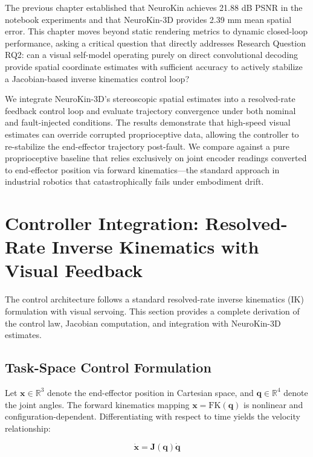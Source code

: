 \documentclass[12pt,a4paper,oneside]{report}
\begin{document}
The previous chapter established that NeuroKin achieves 21.88 dB PSNR in the notebook experiments and that NeuroKin-3D provides 2.39 mm mean spatial error. This chapter moves beyond static rendering metrics to dynamic closed-loop performance, asking a critical question that directly addresses Research Question RQ2: can a visual self-model operating purely on direct convolutional decoding provide spatial coordinate estimates with sufficient accuracy to actively stabilize a Jacobian-based inverse kinematics control loop?

We integrate NeuroKin-3D's stereoscopic spatial estimates into a resolved-rate feedback control loop and evaluate trajectory convergence under both nominal and fault-injected conditions. The results demonstrate that high-speed visual estimates can override corrupted proprioceptive data, allowing the controller to re-stabilize the end-effector trajectory post-fault. We compare against a pure proprioceptive baseline that relies exclusively on joint encoder readings converted to end-effector position via forward kinematics—the standard approach in industrial robotics that catastrophically fails under embodiment drift.

\section{Controller Integration: Resolved-Rate Inverse Kinematics with Visual Feedback}

The control architecture follows a standard resolved-rate inverse kinematics (IK) formulation with visual servoing. This section provides a complete derivation of the control law, Jacobian computation, and integration with NeuroKin-3D estimates.

\subsection{Task-Space Control Formulation}

Let $\mathbf{x} \in \mathbb{R}^3$ denote the end-effector position in Cartesian space, and $\mathbf{q} \in \mathbb{R}^4$ denote the joint angles. The forward kinematics mapping $\mathbf{x} = \text{FK}(\mathbf{q})$ is nonlinear and configuration-dependent. Differentiating with respect to time yields the velocity relationship:

\begin{equation}
\dot{\mathbf{x}} = \mathbf{J}(\mathbf{q}) \dot{\mathbf{q}}
\end{equation}
\end{document}
